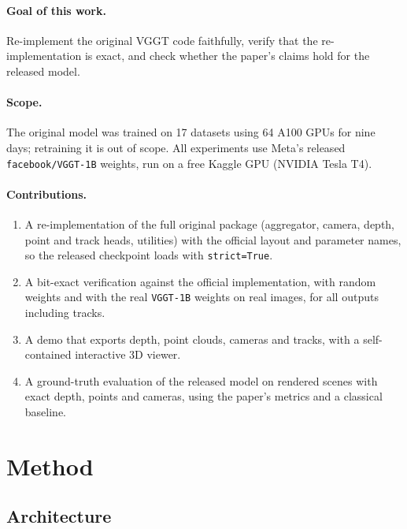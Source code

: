 \documentclass[11pt,a4paper]{article}
\begin{document}
\paragraph{Goal of this work.} Re-implement the original VGGT code faithfully, verify that the re-implementation is exact,
and check whether the paper's claims hold for the released model.

\paragraph{Scope.} The original model was trained on 17 datasets using 64 A100 GPUs for nine days; retraining it is out of
scope. All experiments use Meta's released \texttt{facebook/VGGT-1B} weights, run on a free Kaggle GPU (NVIDIA Tesla T4).

\paragraph{Contributions.}
\begin{enumerate}[leftmargin=*,itemsep=1pt]
  \item A re-implementation of the full original package (aggregator, camera, depth, point and track heads, utilities) with
        the official layout and parameter names, so the released checkpoint loads with \texttt{strict=True}.
  \item A bit-exact verification against the official implementation, with random weights and with the real
        \texttt{VGGT-1B} weights on real images, for all outputs including tracks.
  \item A demo that exports depth, point clouds, cameras and tracks, with a self-contained interactive 3D viewer.
  \item A ground-truth evaluation of the released model on rendered scenes with exact depth, points and cameras, using the
        paper's metrics and a classical baseline.
\end{enumerate}

\section{Method}

\subsection{Architecture}
\end{document}
